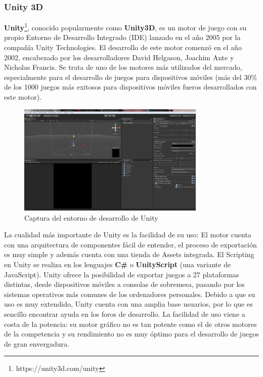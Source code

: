 \subsubsection{Unity 3D}
\textbf{Unity}\footnote{https://unity3d.com/unity}, conocido popularmente como \textbf{Unity3D}, es un motor de juego con su propio Entorno de Desarrollo Integrado (IDE) lanzado en el año 2005 por la compañía Unity Technologies. El desarrollo de este motor comenzó en el año 2002, encabezado por los desarrolladores David Helgason, Joachim Ante y Nicholas Francis. Se trata de uno de los motores más utilizados del mercado, especialmente para el desarrollo de juegos para dispositivos móviles (más del 30\% de los 1000 juegos más exitosos para dispositivos móviles fueros desarrollados con este motor). 
\begin{figure}[h]
	\includegraphics[width=0.8\textwidth]{images/estadodelarte/motores/captura-unity}
	\centering
	\caption{Captura del entorno de desarrollo de Unity}
\end{figure}

La cualidad más importante de Unity es la facilidad de su uso: El motor cuenta con una arquitectura de componentes fácil de entender, el proceso de exportación es muy simple y además cuenta con una tienda de Assets integrada. El Scripting en Unity se realiza en los lenguajes \textbf{C\#} o \textbf{UnityScript} (una variante de JavaScript). Unity ofrece la posibilidad de exportar juegos a 27 plataformas distintas, desde dispositivos móviles a consolas de sobremesa, pasando por los sistemas operativos más comunes de los ordenadores personales. Debido a que su uso es muy extendido, Unity cuenta con una amplia base usuarios, por lo que es sencillo encontrar ayuda en los foros de desarrollo. La facilidad de uso viene a costa de la potencia: su motor gráfico no es tan potente como el de otros motores de la competencia y su rendimiento no es muy óptimo para el desarrollo de juegos de gran envergadura.

